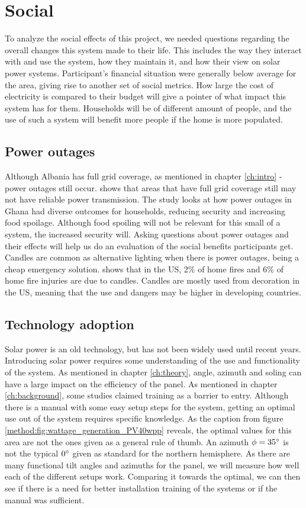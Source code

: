 \section{Social}
To analyze the social effects of this project, we needed questions regarding the overall changes this system made to their life. This includes the way they interact with and use the system, how they maintain it, and how their view on solar power systems. Participant's financial situation were generally below average for the area, giving rise to another set of social metrics. How large the cost of electricity is compared to their budget will give a pointer of what impact this system has for them. Households will be of different amount of people, and the use of such a system will benefit more people if the home is more populated. 

\subsection{Power outages}
\label{ch:metod:powerout}
Although Albania has full grid coverage, as mentioned in chapter \ref{ch:intro} - power outages still occur. \citep{nduhuuraImpactsElectricityOutages2021} shows that areas that have full grid coverage still may not have reliable power transmission. The study looks at how power outages in Ghana had diverse outcomes for households, reducing security and increasing food spoilage. Although food spoiling will not be relevant for this small of a system, the increased security will. Asking questions about power outages and their effects will help us do an evaluation of the social benefits participants get. Candles are common as alternative lighting when there is power outages, being a cheap emergency solution. \citep{martyahrensHomeCandleFires2020} shows that in the US, 2\% of home fires and 6\% of home fire injuries are due to candles. Candles are mostly used from decoration in the US, meaning that the use and dangers may be higher in developing countries. 

\subsection{Technology adoption}
Solar power is an old technology, but has not been widely used until recent years. Introducing solar power requires some understanding of the use and functionality of the system. As mentioned in chapter \ref{ch:theory}, angle, azimuth and soling can have a large impact on the efficiency of the panel. As mentioned in chapter \ref{ch:background}, some studies claimed training as a barrier to entry. Although there is a manual with some easy setup steps for the system, getting an optimal use out of the system requires specific knowledge. As the caption from figure \ref{method:fig:wattage_generation_PV40wpp} reveals, the optimal values for this area are not the ones given as a general rule of thumb. An azimuth $\phi=35\degree$ is not the typical $0\degree$ given as standard for the northern hemisphere. As there are many functional tilt angles and azimuths for the panel, we will measure how well each of the different setups work. Comparing it towards the optimal, we can then see if there is a need for better installation training of the systems or if the manual was sufficient. 

